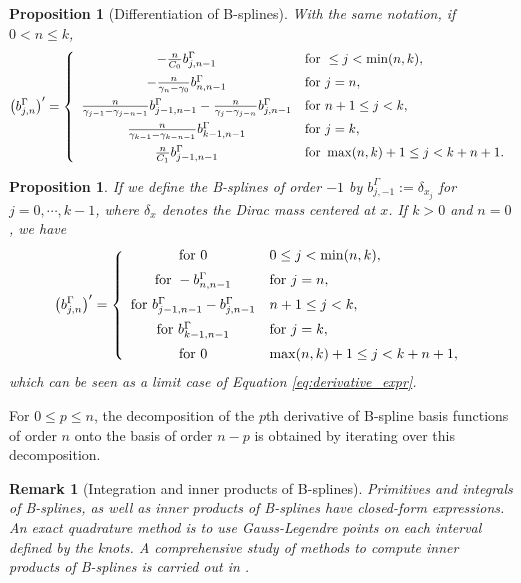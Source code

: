 \documentclass[a4paper]{article}
\newtheorem{prop}[theo]{Proposition}
\newtheorem*{remark}{Remark}
\newcommand{\1}{\textbf{1}}
\begin{document}
\begin{prop}[Differentiation of B-splines]\label{prop:b_spline_derivatives}
With the same notation, if $0 < n \leq k$,
\begin{equation}\label{eq:derivative_expr}
\left(b^\Gamma_{j,n}\right)' = \left\{\begin{array}{cl}
-\frac{n}{C_0}b^\Gamma_{j,n-1} & \textnormal{for} \ \leq j < \min(n,k), \\[2mm]
-\frac{n}{\gamma_n - \gamma_0} b^\Gamma_{n,n-1} & \textnormal{for} \ j = n, \\[2mm]
\frac{n}{\gamma_{j-1} - \gamma_{j-n-1}} b^\Gamma_{j-1,n-1} - \frac{n}{\gamma_j - \gamma_{j-n}} b^\Gamma_{j,n-1} & \textnormal{for} \ n+1 \leq j < k,\\[2mm]
\frac{n}{\gamma_{k-1} - \gamma_{k-n-1}} b^\Gamma_{k-1,n-1} & \textnormal{for} \ j = k, \\[2mm]
\frac{n}{C_1} b^\Gamma_{j-1,n-1} & \textnormal{for} \ \max(n,k)+1 \leq j < k + n + 1.
\end{array}\right.
\end{equation}
\end{prop}
\begin{prop}\label{prop:b_spline_derivatives_higher_order}
If we define the B-splines of order $-1$ by $b^\Gamma_{j,-1} := \delta_{x_j}$ for $j=0, \cdots, k-1$, where $\delta_x$ denotes the Dirac mass centered at $x$. If $k>0$ and $n=0$, we have
\begin{equation}\label{eq:higher_derivative_expr}
\left(b^\Gamma_{j,n}\right)' = \left\{\begin{array}{cl}
\textnormal{for} \ 0 & 0 \leq j < \min(n,k), \\[2mm]
\textnormal{for} \ -b^\Gamma_{n,n-1} & \textnormal{for} \ j = n, \\[2mm]
\textnormal{for} \ b^\Gamma_{j-1,n-1} - b^\Gamma_{j,n-1} & n+1 \leq j < k,\\[2mm]
\textnormal{for} \ b^\Gamma_{k-1,n-1} &\textnormal{for} \ j = k, \\[2mm]
\textnormal{for} \ 0 & \max(n,k)+1 \leq j < k + n + 1,
\end{array}\right.
\end{equation}
which can be seen as a limit case of Equation \eqref{eq:derivative_expr}.
\end{prop}
\par \noindent For $0 \leq p \leq n$, the decomposition of the $p$th derivative of B-spline basis functions of order $n$ onto the basis of order $n-p$ is obtained by iterating over this decomposition. 
\begin{remark}[Integration and inner products of B-splines]
\par Primitives and integrals of B-splines, as well as inner products of B-splines have closed-form expressions. An exact quadrature method is to use Gauss-Legendre points on each interval defined by the knots. A comprehensive study of methods to compute inner products of B-splines is carried out in \cite{VermeulentBartelsHeppler}. 
\end{remark}
\end{document}
